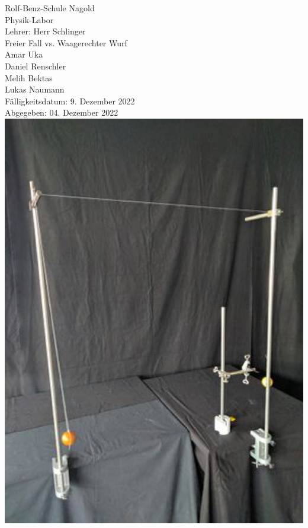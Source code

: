 \documentclass[12p]{article}
\begin{document}
\begin{center}
Rolf-Benz-Schule Nagold\\
Physik-Labor\\
Lehrer: Herr Schlinger \\
\vspace{20pt}
\huge Freier Fall vs. Waagerechter Wurf\\
\vspace{80pt}
\large 
Amar Uka\\
Daniel Renschler\\
Melih Bektas\\
Lukas Naumann\\
\vspace{18pt}
Fälligkeitsdatum: 9. Dezember 2022 \\
Abgegeben: 04. Dezember 2022 \\
\vspace{18pt}
\includegraphics[scale=0.23]{versuch freier fall.jpeg}
\end{center}
\end{document}
